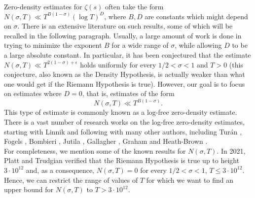\documentclass[reqno]{amsart}
\numberwithin{equation}{section}
\theoremstyle{remark}
\begin{document}
Zero-density estimates for $\zeta(s)$ often take the form $
N(\sigma, T) \ll T^{B(1-\sigma)}(\log T)^D
$, where $B, D$ are constants which might depend on $\sigma$. There is an extensive literature on such results, some of which will be recalled in the following paragraph. Usually, a large amount of work is done in trying to minimize the exponent $B$ for a wide range of $\sigma$, while allowing $D$ to be a large absolute constant. In particular, it has been conjectured that the estimate $N(\sigma,T)\ll T^{2(1-\sigma)+\epsilon}$ holds uniformly for every $1/2<\sigma<1$ and $T>0$ (this conjecture, also known as the Density Hypothesis, is actually weaker than what one would get if the Riemann Hypothesis is true). However, our goal is to focus on estimates where $D=0$, that is, estimates of the form
\begin{equation}\label{logfreebound}
N(\sigma,T)\ll T^{B(1-\sigma)}.  
\end{equation}
This type of estimate is commonly known as a log-free zero-density estimate. There is a vast number of research works on the log-free zero-density estimates, starting with Linnik \cite{Lin44, Lin44a} and following with many other authors, including Turán \cite{Turan61}, Fogels \cite{Fogels1965}, Bombieri \cite{bombiericrible}, Jutila \cite{jutila77}, Gallagher \cite{gallagher_large_1970}, Graham \cite{graham_linniks_1981} and Heath-Brown \cite{hb92}.\\
For completeness, we mention some of the known results for $N(\sigma,T)$. In 2021, Platt and Trudgian \cite{platt_riemann_2021} verified that the Riemann Hypothesis is true up to height $3\cdot 10^{12}$ and, as a consequence, $N(\sigma,T)=0$ for every $1/2<\sigma<1$, $T\le 3\cdot 10^{12}$. Hence, we can restrict the range of values of $T$ for which we want to find an upper bound for $N(\sigma,T)$ to $T>3\cdot 10^{12}$.
\end{document}
